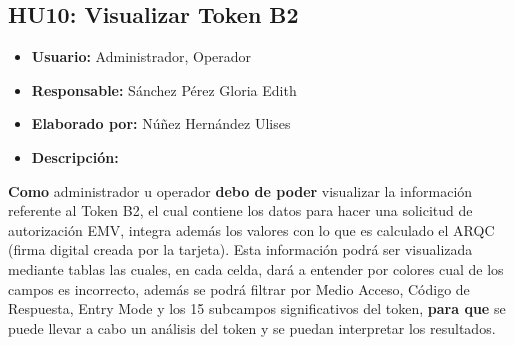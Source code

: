 \subsection{HU10: Visualizar Token B2}
\begin{itemize}
	\item \textbf{Usuario:} Administrador, Operador
	\item \textbf{Responsable:} Sánchez Pérez Gloria Edith
	\item \textbf{Elaborado por:} Núñez Hernández Ulises
	\item \textbf{Descripción:}
\end{itemize}
\textbf{Como} administrador u operador \textbf{debo de poder} visualizar la información referente al Token B2, el cual contiene los datos para hacer una solicitud de autorización EMV, integra además los valores con lo que es calculado el ARQC (firma digital creada por la tarjeta). Esta información podrá ser visualizada mediante tablas las cuales, en cada celda, dará a entender por colores cual de los campos es incorrecto, además se podrá filtrar por Medio Acceso, Código de Respuesta, Entry Mode y los 15 subcampos significativos del token, \textbf{para que} se puede llevar a cabo un análisis del token y se puedan interpretar los resultados.